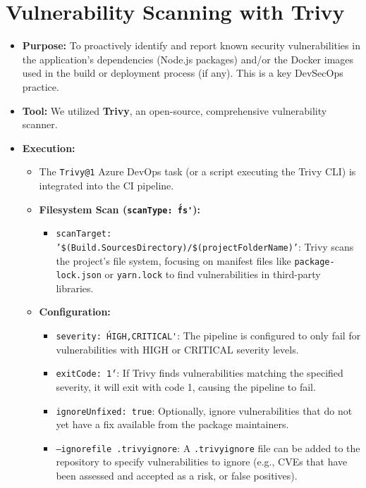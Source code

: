 \section{Vulnerability Scanning with Trivy}
\label{sec:VulnerabilityScanningTrivy}

\begin{itemize}
    \item \textbf{Purpose:} To proactively identify and report known security vulnerabilities in the application's dependencies (Node.js packages) and/or the Docker images used in the build or deployment process (if any). This is a key DevSecOps practice.
    \item \textbf{Tool:} We utilized \textbf{Trivy}, an open-source, comprehensive vulnerability scanner.
    \item \textbf{Execution:}
    \begin{itemize}
        \item The \texttt{Trivy@1} Azure DevOps task (or a script executing the Trivy CLI) is integrated into the CI pipeline.
        \item \textbf{Filesystem Scan (\texttt{scanType: \'fs\'}):}
        \begin{itemize}
            \item \texttt{scanTarget: '\$(Build.SourcesDirectory)/\$(projectFolderName)'}: Trivy scans the project's file system, focusing on manifest files like \texttt{package-lock.json} or \texttt{yarn.lock} to find vulnerabilities in third-party libraries.
        \end{itemize}
        \item \textbf{Configuration:}
        \begin{itemize}
            \item \texttt{severity: \'HIGH,CRITICAL\'}: The pipeline is configured to only fail for vulnerabilities with HIGH or CRITICAL severity levels.
            \item \texttt{exitCode: \'1\'}: If Trivy finds vulnerabilities matching the specified severity, it will exit with code 1, causing the pipeline to fail.
            \item \texttt{ignoreUnfixed: true}: Optionally, ignore vulnerabilities that do not yet have a fix available from the package maintainers.
            \item \texttt{--ignorefile .trivyignore}: A \texttt{.trivyignore} file can be added to the repository to specify vulnerabilities to ignore (e.g., CVEs that have been assessed and accepted as a risk, or false positives).

\end{itemize}
\end{itemize}
\end{itemize}
